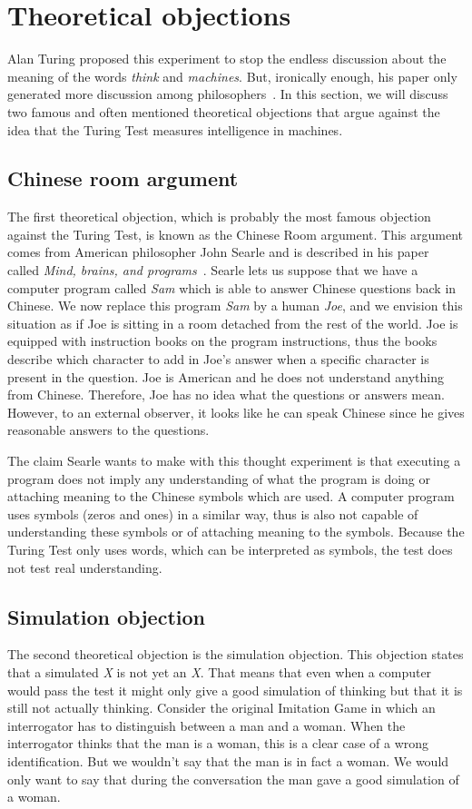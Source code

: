 \section{Theoretical objections}

Alan Turing proposed this experiment to stop the endless discussion about the meaning of the words \textit{think} and \textit{machines}. But, ironically enough, his paper only generated more discussion among philosophers~\cite{dennett2004can}. In this section, we will discuss two famous and often mentioned theoretical objections that argue against the idea that the Turing Test measures intelligence in machines.

\subsection{Chinese room argument}
The first theoretical objection, which is probably the most famous objection against the Turing Test, is known as the Chinese Room argument. This argument comes from American philosopher John Searle and is described in his paper called \textit{Mind, brains, and programs}~\cite{searle1980minds}. Searle lets us suppose that we have a computer program called \textit{Sam} which is able to answer Chinese questions back in Chinese. We now replace this program \textit{Sam} by a human \textit{Joe}, and we envision this situation as if Joe is sitting in a room detached from the rest of the world. Joe is equipped with instruction books on the program instructions, thus the books describe which character to add in Joe's answer when a specific character is present in the question. Joe is American and he does not understand anything from Chinese. Therefore, Joe has no idea what the questions or answers mean. However, to an external observer, it looks like he can speak Chinese since he gives reasonable answers to the questions.

The claim Searle wants to make with this thought experiment is that executing a program does not imply any understanding of what the program is doing or attaching meaning to the Chinese symbols which are used. A computer program uses symbols (zeros and ones) in a similar way, thus is also not capable of understanding these symbols or of attaching meaning to the symbols. Because the Turing Test only uses words, which can be interpreted as symbols, the test does not test real understanding.


\subsection{Simulation objection}
The second theoretical objection is the simulation objection. This objection states that a simulated \textit{X} is not yet an \textit{X}. That means that even when a computer would pass the test it might only give a good simulation of thinking but that it is still not actually thinking. Consider the original Imitation Game in which an interrogator has to distinguish between a man and a woman. When the interrogator thinks that the man is a woman, this is a clear case of a wrong identification. But we wouldn't say that the man is in fact a woman. We would only want to say that during the conversation the man gave a good simulation of a woman.

